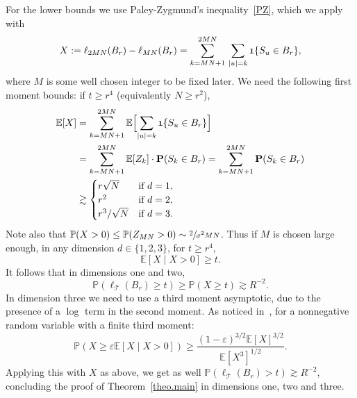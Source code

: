 \documentclass[11pt]{article}
\numberwithin{equation}{section}
\theoremstyle{plain}
\theoremstyle{definition}
\newcommand\T{\mathcal{T}}
\newcommand{\1}{{\text{\Large $\mathfrak 1$}}}
\begin{document}
For the lower bounds we use Paley-Zygmund's inequality~\eqref{PZ},
which we apply with
\[
X:= \ell_{2MN}(B_r) - \ell_{MN}(B_r) = \sum_{k=MN+1}^{2MN}\,
\sum_{|u|=k} \1\{S_u\in B_r\},
\]
where $M$ is some well chosen integer to be fixed later.
We need the following first moment bounds: if $t\ge r^4$ (equivalently $N\ge r^2$),
\begin{align*}
\mathbb E[X] & = \sum_{k=MN+1}^{2MN} \mathbb E\Bigl[
\sum_{|u|=k} \1\{S_u \in B_r\}\Bigr]\\
&= \sum_{k=MN+1}^{2MN} \mathbb E[Z_k] \cdot \mathbf P(S_k \in B_r) = \sum_{k=MN+1}^{2MN}\mathbf P(S_k \in B_r) \\
& \gtrsim
\begin{cases}
r\sqrt N & \text{if }d=1, \\
r^2 & \text{if }d=2, \\
r^3/\sqrt{N} & \text{if }d=3.
\end{cases}
\end{align*}
Note also that $\mathbb P(X>0) \le \mathbb P(Z_{MN}>0) \sim \sfrac2 {\sigma^2MN}$. Thus if $M$ is chosen large enough, in any dimension $d\in \{1,2,3\}$, for $t\ge r^4$,
\begin{equation*}
\mathbb E[X\mid X>0] \geq t.
\end{equation*}
It follows that in dimensions one and two,
\[
\mathbb P(\ell_\T(B_r)\ge t ) \ge \mathbb P(X\ge t ) \gtrsim R^{-2}.
\]
In dimension three we need to use a third moment asymptotic, due to the presence of a $\log $ term in the second moment.
As noticed in~\cite[Lem.\,4.4]{AHJ}, for a nonnegative random variable with a finite third moment:
\[
\mathbb P(X\ge \varepsilon \mathbb E[X\mid X>0] )\ge \frac{(1-\varepsilon)^{3/2}\mathbb E[X]^{3/2}}{\mathbb E[X^3]^{1/2}}.
\]
Applying this with $X$ as above,
we get as well $\mathbb P(\ell_\T(B_r)>t ) \gtrsim R^{-2}$, concluding the proof of Theorem~\ref{theo.main} in dimensions one, two and three.
\end{document}
